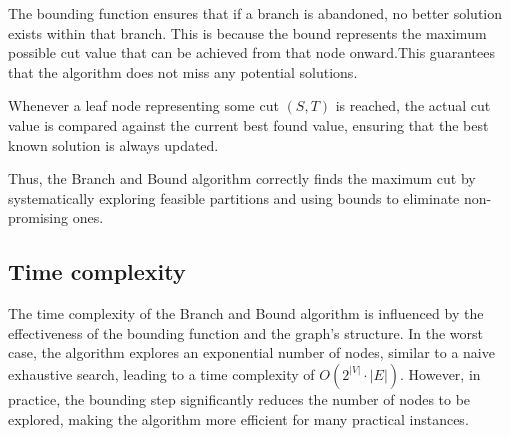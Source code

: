 The bounding function ensures that if a branch is abandoned, no better solution exists within that branch. This is because the bound represents the maximum possible cut value that can be achieved from that node onward.This guarantees that the algorithm does not miss any potential solutions.

Whenever a leaf node representing some cut \((S, T)\) is reached, the actual cut value is compared against the current best found value, ensuring that the best known solution is always updated.

Thus, the Branch and Bound algorithm correctly finds the maximum cut by systematically exploring feasible partitions and using bounds to eliminate non-promising ones.

\subsection{Time complexity}
The time complexity of the Branch and Bound algorithm is influenced by the effectiveness of the bounding function and the graph's structure. In the worst case, the algorithm explores an exponential number of nodes, similar to a naive exhaustive search, leading to a time complexity of \(O(2^{|V|} \cdot |E|)\). However, in practice, the bounding step significantly reduces the number of nodes to be explored, making the algorithm more efficient for many practical instances.